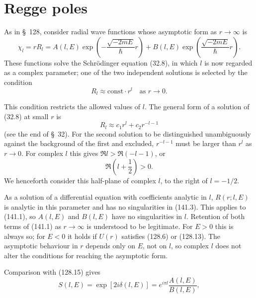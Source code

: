 \section{Regge poles}



As in \S~128, consider radial wave functions whose asymptotic form as $r\to\infty$ is
\begin{equation}
 \chi_l=rR_l=A(l,E)\exp\left(-\frac{\sqrt{-2mE}}{\hbar}r\right)
 +B(l,E)\exp\left(\frac{\sqrt{-2mE}}{\hbar}r\right).
 \tag{141.1}
\end{equation}
These functions solve the Schrödinger equation (32.8), in which $l$ is now regarded as a complex parameter; one of the two independent solutions is selected by the condition
\begin{equation}
 R_l\approx\mathrm{const}\cdot r^l\quad\text{as }r\to0.
 \tag{141.2}
\end{equation}

This condition restricts the allowed values of $l$. The general form of a solution of (32.8) at small $r$ is
\[
 R_l\approx c_1r^l+c_2r^{-l-1}
\]
(see the end of \S~32). For the second solution to be distinguished unambiguously against the background of the first and excluded, $r^{-l-1}$ must be larger than $r^l$ as $r\to0$. For complex $l$ this gives $\Re l>\Re(-l-1)$, or
\begin{equation}
 \Re\left(l+\frac12\right)>0.
 \tag{141.3}
\end{equation}
We henceforth consider this half-plane of complex $l$, to the right of $l=-1/2$.

As a solution of a differential equation with coefficients analytic in $l$, $R(r;l,E)$ is analytic in this parameter and has no singularities in (141.3). This applies to (141.1), so $A(l,E)$ and $B(l,E)$ have no singularities in $l$. Retention of both terms of (141.1) as $r\to\infty$ is understood to be legitimate. For $E>0$ this is always so; for $E<0$ it holds if $U(r)$ satisfies (128.6) or (128.13). The asymptotic behaviour in $r$ depends only on $E$, not on $l$, so complex $l$ does not alter the conditions for reaching the asymptotic form.

Comparison with (128.15) gives
\begin{equation}
 S(l,E)=\exp[2i\delta(l,E)]=e^{i\pi l}\frac{A(l,E)}{B(l,E)},
 \tag{141.4}
\end{equation}

